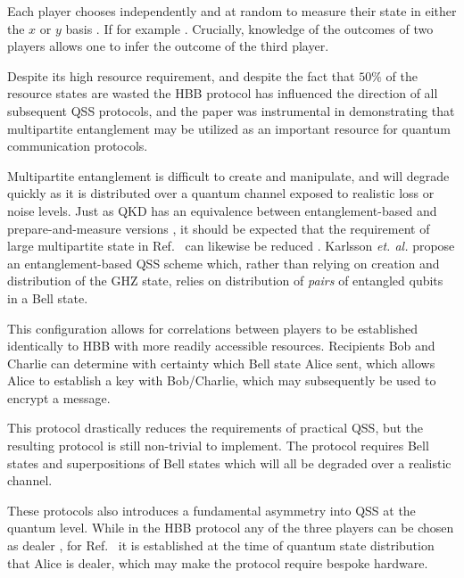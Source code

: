Each player chooses independently and at random to measure their state in either the $x$ or $y$ basis . If for example .  Crucially, knowledge of the outcomes of two players allows one to infer the outcome of the third player.  

Despite its high resource requirement, and despite the fact that $50\%$ of the resource states are wasted  the HBB protocol has influenced the direction of all subsequent QSS protocols, and the paper was instrumental in demonstrating that multipartite entanglement may be utilized as an important resource for quantum communication protocols. 

Multipartite entanglement is difficult to create and manipulate, and will degrade quickly as it is distributed over a quantum channel exposed to realistic loss or noise levels. Just as QKD has an equivalence between entanglement-based and prepare-and-measure versions , it should be expected that the requirement of large multipartite state in Ref.~\cite{Hillery1999} can likewise be reduced \cite{Karlsson1999, Tittel2001, Zhang2005b, Williams2019}. Karlsson \emph{et. al.} \cite{Karlsson1999} propose an entanglement-based QSS scheme which, rather than relying on creation and distribution of the GHZ state, relies on distribution of \emph{pairs} of entangled qubits in a Bell state. 

This configuration allows for correlations between players to be established identically to HBB with more readily accessible resources. Recipients Bob and Charlie can determine with certainty which Bell state Alice sent, which allows Alice to establish a key with Bob/Charlie, which may subsequently be used to encrypt a message. 

This protocol drastically reduces the requirements of practical QSS, but the resulting protocol is still non-trivial to implement. The protocol requires Bell states and superpositions of Bell states which will all be degraded over a realistic channel. 

These protocols also introduces a fundamental asymmetry into QSS at the quantum level. While in the HBB protocol any of the three players can be chosen as dealer , for Ref.~\cite{Karlsson1999} it is established at the time of quantum state distribution that Alice is dealer, which may make the protocol require bespoke hardware.

